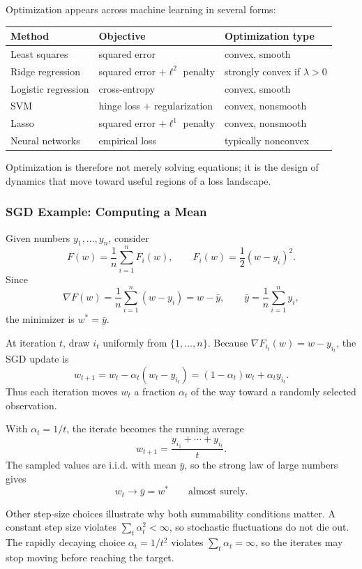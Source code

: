 \documentclass[12pt,oneside]{book}
\numberwithin{equation}{section}
\theoremstyle{definition}
\theoremstyle{plain}
\theoremstyle{remark}
\begin{document}
Optimization appears across machine learning in several forms:
\begin{center}
\begin{tabular}{@{}lll@{}}
\toprule
\textbf{Method} & \textbf{Objective} & \textbf{Optimization type}\\
\midrule
Least squares & squared error & convex, smooth\\
Ridge regression & squared error $+\ell^2$ penalty & strongly convex if $\lambda>0$\\
Logistic regression & cross-entropy & convex, smooth\\
SVM & hinge loss $+$ regularization & convex, nonsmooth\\
Lasso & squared error $+\ell^1$ penalty & convex, nonsmooth\\
Neural networks & empirical loss & typically nonconvex\\
\bottomrule
\end{tabular}
\end{center}
Optimization is therefore not merely solving equations; it is the design of dynamics that move toward useful regions of a loss landscape.

\subsubsection{SGD Example: Computing a Mean}
Given numbers $y_1,\ldots,y_n$, consider
\[
F(w)=\frac{1}{n}\sum_{i=1}^nF_i(w),
\qquad
F_i(w)=\frac{1}{2}(w-y_i)^2.
\]
Since
\[
\nabla F(w)=\frac{1}{n}\sum_{i=1}^n(w-y_i)
=w-\bar y,
\qquad
\bar y=\frac{1}{n}\sum_{i=1}^ny_i,
\]
the minimizer is $w^*=\bar y$.

At iteration $t$, draw $i_t$ uniformly from $\{1,\ldots,n\}$. Because $\nabla F_{i_t}(w)=w-y_{i_t}$, the SGD update is
\[
w_{t+1}
=w_t-\alpha_t(w_t-y_{i_t})
=(1-\alpha_t)w_t+\alpha_ty_{i_t}.
\]
Thus each iteration moves $w_t$ a fraction $\alpha_t$ of the way toward a randomly selected observation.

With $\alpha_t=1/t$, the iterate becomes the running average
\[
w_{t+1}=\frac{y_{i_1}+\cdots+y_{i_t}}{t}.
\]
The sampled values are i.i.d. with mean $\bar y$, so the strong law of large numbers gives
\[
w_t\longrightarrow\bar y=w^*
\qquad\text{almost surely}.
\]

Other step-size choices illustrate why both summability conditions matter. A constant step size violates $\sum_t\alpha_t^2<\infty$, so stochastic fluctuations do not die out. The rapidly decaying choice $\alpha_t=1/t^2$ violates $\sum_t\alpha_t=\infty$, so the iterates may stop moving before reaching the target.
\end{document}

